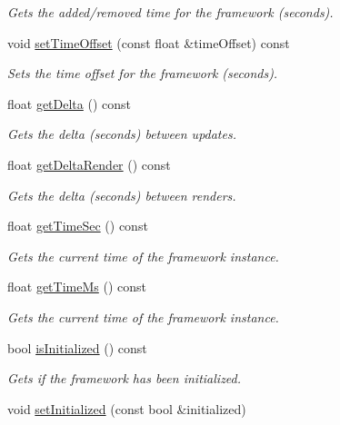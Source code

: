 \begin{DoxyCompactItemize}
\begin{DoxyCompactList}\small\item\em Gets the added/removed time for the framework (seconds). \end{DoxyCompactList}\item 
void \hyperlink{classflounder_1_1framework_a572ccf8c4d7c90687b35bc7efc94c0e2}{set\+Time\+Offset} (const float \&time\+Offset) const
\begin{DoxyCompactList}\small\item\em Sets the time offset for the framework (seconds). \end{DoxyCompactList}\item 
float \hyperlink{classflounder_1_1framework_a180884fa93e39405354e4dcf329169d2}{get\+Delta} () const
\begin{DoxyCompactList}\small\item\em Gets the delta (seconds) between updates. \end{DoxyCompactList}\item 
float \hyperlink{classflounder_1_1framework_a98b4dd1aa26132eee232c2618ebb1578}{get\+Delta\+Render} () const
\begin{DoxyCompactList}\small\item\em Gets the delta (seconds) between renders. \end{DoxyCompactList}\item 
float \hyperlink{classflounder_1_1framework_aaf001b25a809bb91642a5c978e610169}{get\+Time\+Sec} () const
\begin{DoxyCompactList}\small\item\em Gets the current time of the framework instance. \end{DoxyCompactList}\item 
float \hyperlink{classflounder_1_1framework_a8d8f401ca64f2b4f7a8389049b83de92}{get\+Time\+Ms} () const
\begin{DoxyCompactList}\small\item\em Gets the current time of the framework instance. \end{DoxyCompactList}\item 
bool \hyperlink{classflounder_1_1framework_ad217b91b7e0f46f305105045396dcdf3}{is\+Initialized} () const
\begin{DoxyCompactList}\small\item\em Gets if the framework has been initialized. \end{DoxyCompactList}\item 
void \hyperlink{classflounder_1_1framework_a06963c9a669b09c6e33547a6766432df}{set\+Initialized} (const bool \&initialized)

\end{DoxyCompactItemize}
